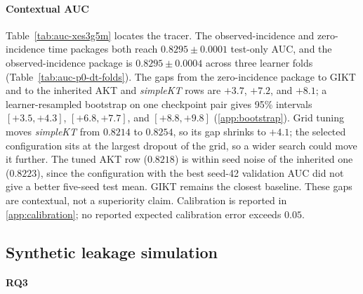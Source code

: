 \documentclass[review,12pt]{elsarticle}
\begin{document}


\paragraph{Contextual AUC}
Table~\ref{tab:auc-xes3g5m} locates the tracer. The observed-incidence
and zero-incidence time packages both reach $0.8295{\pm}0.0001$
test-only AUC, and the observed-incidence package is
$0.8295{\pm}0.0004$ across three learner folds
(Table~\ref{tab:auc-p0-dt-folds}). The gaps from the zero-incidence
package to GIKT and to the inherited AKT and \textit{simpleKT} rows are
$+3.7$, $+7.2$, and $+8.1$; a learner-resampled bootstrap on one
checkpoint pair gives 95\% intervals $[+3.5,+4.3]$, $[+6.8,+7.7]$, and
$[+8.8,+9.8]$ (\ref{app:bootstrap}). Grid tuning moves
\textit{simpleKT} from $0.8214$ to $0.8254$, so its gap shrinks to
$+4.1$; the selected configuration sits at the largest dropout of the
grid, so a wider search could move it further. The tuned AKT row
($0.8218$) is within seed noise of the inherited one ($0.8223$), since
the configuration with the best seed-42 validation AUC did not give a
better five-seed test mean. GIKT remains the closest baseline. These
gaps are contextual, not a superiority claim. Calibration is reported
in \ref{app:calibration}; no reported expected calibration error
exceeds $0.05$.



\subsection{Synthetic leakage simulation}
\label{sec:leak-sim}
\paragraph{RQ3}
\end{document}
